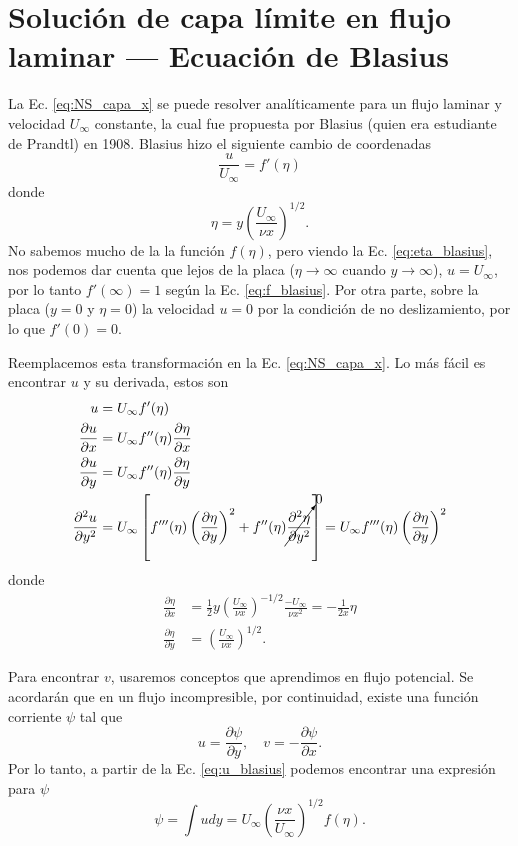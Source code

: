 \section*{Solución de capa límite en flujo laminar --- Ecuación de Blasius}
La Ec. \eqref{eq:NS_capa_x} se puede resolver analíticamente para un flujo laminar y velocidad $U_\infty$ constante, la cual fue propuesta por Blasius (quien era estudiante de Prandtl) en 1908.
Blasius hizo el siguiente cambio de coordenadas
%
\begin{equation}\label{eq:f_blasius}
\frac{u}{U_\infty} = f'(\eta)
\end{equation}
%
donde 
%
\begin{equation}\label{eq:eta_blasius}
\eta = y\left(\frac{U_\infty}{\nu x}\right)^{1/2}.
\end{equation}
%
No sabemos mucho de la la función $f(\eta)$, pero viendo la Ec. \eqref{eq:eta_blasius}, nos podemos dar cuenta que lejos de la placa ($\eta\to\infty$ cuando $y\to\infty$), $u=U_\infty$, por lo tanto $f'(\infty) = 1$ según la Ec. \eqref{eq:f_blasius}.
Por otra parte, sobre la placa ($y=0$ y $\eta=0$) la velocidad $u=0$ por la condición de no deslizamiento, por lo que $f'(0)=0$.

Reemplacemos esta transformación en la Ec. \eqref{eq:NS_capa_x}.
Lo más fácil es encontrar $u$ y su derivada, estos son
%
\begin{align}\label{eq:u_blasius}
u &= U_\infty f'(\eta) \nonumber\\
\frac{\partial u}{\partial x} &= U_\infty f''(\eta)\frac{\partial \eta}{\partial x}\nonumber\\
\frac{\partial u}{\partial y} &= U_\infty f''(\eta)\frac{\partial \eta}{\partial y}\nonumber\\
\frac{\partial^2 u}{\partial y^2} &= U_\infty \left[f'''(\eta)\left(\frac{\partial \eta}{\partial y}\right)^2 + f''(\eta)\cancelto{0}{\frac{\partial^2\eta}{\partial y^2}}\right] = U_\infty f'''(\eta)\left(\frac{\partial \eta}{\partial y}\right)^2
\end{align}
%
donde
%
\begin{align}\label{eq:deta_dx}
\frac{\partial \eta}{\partial x} &= \frac{1}{2}y\left(\frac{U_\infty}{\nu x}\right)^{-1/2} \frac{-U_\infty}{\nu x^2} = -\frac{1}{2x} \eta\nonumber\\
\frac{\partial \eta}{\partial y} &= \left(\frac{U_\infty}{\nu x}\right)^{1/2}.
\end{align}

Para encontrar $v$, usaremos conceptos que aprendimos en flujo potencial.
Se acordarán que en un flujo incompresible, por continuidad, existe una función corriente $\psi$ tal que
%
\begin{equation}
u=\frac{\partial\psi}{\partial y}, \quad v=-\frac{\partial\psi}{\partial x}.
\end{equation}
%
Por lo tanto, a partir de la Ec. \eqref{eq:u_blasius} podemos encontrar una expresión para $\psi$
%
\begin{equation}\label{eq:psi_1}
\psi = \int u dy = U_\infty \left(\frac{\nu x}{U_\infty}\right)^{1/2}f(\eta).
\end{equation}

